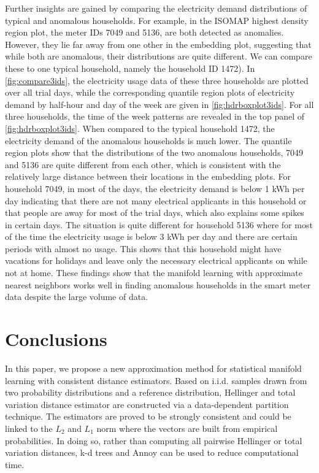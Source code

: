 \documentclass{article}
\begin{document}
Further insights are gained by comparing the electricity demand
distributions of typical and anomalous households. For example, in the
ISOMAP highest density region plot, the meter IDs 7049 and 5136, are
both detected as anomalies. However, they lie far away from one other in
the embedding plot, suggesting that while both are anomalous, their
distributions are quite different. We can compare these to one typical
household, namely the household ID 1472). In \autoref{fig:compare3ids},
the electricity usage data of these three households are plotted over
all trial days, while the corresponding quantile region plots of
electricity demand by half-hour and day of the week are given in
\autoref{fig:hdrboxplot3ids}. For all three households, the time of the
week patterns are revealed in the top panel of
\autoref{fig:hdrboxplot3ids}. When compared to the typical household
1472, the electricity demand of the anomalous households is much lower.
The quantile region plots show that the distributions of the two
anomalous households, 7049 and 5136 are quite different from each other,
which is consistent with the relatively large distance between their
locations in the embedding plots. For household 7049, in most of the
days, the electricity demand is below 1 kWh per day indicating that
there are not many electrical applicants in this household or that
people are away for most of the trial days, which also explains some
spikes in certain days. The situation is quite different for household
5136 where for most of the time the electricity usage is below 3 kWh per
day and there are certain periods with almost no usage. This shows that
this household might have vacations for holidays and leave only the
necessary electrical applicants on while not at home. These findings
show that the manifold learning with approximate nearest neighbors works
well in finding anomalous households in the smart meter data despite the
large volume of data.

\hypertarget{conclusion}{%
\section{Conclusions}\label{conclusion}}

In this paper, we propose a new approximation method for statistical
manifold learning with consistent distance estimators. Based on i.i.d.
samples drawn from two probability distributions and a reference
distribution, Hellinger and total variation distance estimator are
constructed via a data-dependent partition technique. The estimators are
proved to be strongly consistent and could be linked to the \(L_2\) and
\(L_1\) norm where the vectors are built from empirical probabilities.
In doing so, rather than computing all pairwise Hellinger or total
variation distances, k-d trees and Annoy can be used to reduce
computational time.
\end{document}

